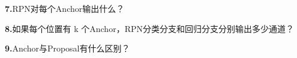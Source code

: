 \documentclass[UTF8,openany,oneside,zihao=-4,fontset=windows]{ctexbook}
\newif\ifshowsolutions
\newcommand{\Question}[2]{%
  \par\Needspace{4\baselineskip}\medskip
  \noindent\textbf{\color{MVBlue}#1}\quad #2\par
}
\newenvironment{AnswerBox}{\begin{tcolorbox}[breakable,colback=MVLight,colframe=MVBlue!45,title={参考答案},fonttitle=\bfseries,boxrule=0.55pt,arc=1.5mm,left=2mm,right=2mm,top=1.5mm,bottom=1.5mm]}{\end{tcolorbox}}
\newcommand{\PracticeSpace}[1]{\ifshowsolutions\else\par\vspace{#1}\par\fi}
\begin{document}
\else
\PracticeSpace{2.4cm}
\fi
\Question{7.}{RPN对每个Anchor输出什么？}
\ifshowsolutions
\begin{AnswerBox}
\par\noindent\textbf{RPN对每个Anchor通常输出两类结果：}
\par\noindent\textbullet\quad 目标性分类结果：判断Anchor是前景还是背景；
\par 边界框回归结果：预测4个坐标偏移量。
\par\noindent\textbf{边界框回归通常包括：}
\begin{center}\small\ttfamily t\_x ,t\_y ,t\_w ,t\_h\end{center}
\par\noindent\textbf{分别控制：}
\par\noindent\textbullet\quad 中心横坐标移动；
\par\noindent\textbullet\quad 中心纵坐标移动；
\par\noindent\textbullet\quad 宽度缩放；
\par 高度缩放。
\end{AnswerBox}
\else
\PracticeSpace{2.4cm}
\fi
\Question{8.}{如果每个位置有 k 个Anchor，RPN分类分支和回归分支分别输出多少通道？}
\ifshowsolutions
\begin{AnswerBox}
\par 若二分类采用每个Anchor两个分数，即前景和背景，则分类分支输出：
\par 2k
\par 个通道。
\par\noindent\textbf{每个Anchor需要预测4个回归量，所以回归分支输出：}
\par 4k
\par 个通道。
\par\noindent\textbf{例如每个位置有9个Anchor：}
\par 分类输出通道=2×9=18
\par 回归输出通道=4×9=36
\par 有些实现使用每个Anchor一个前景分数，此时分类输出为 k 个通道。
\end{AnswerBox}
\else
\PracticeSpace{2.4cm}
\fi
\Question{9.}{Anchor与Proposal有什么区别？}
\ifshowsolutions
\end{document}

